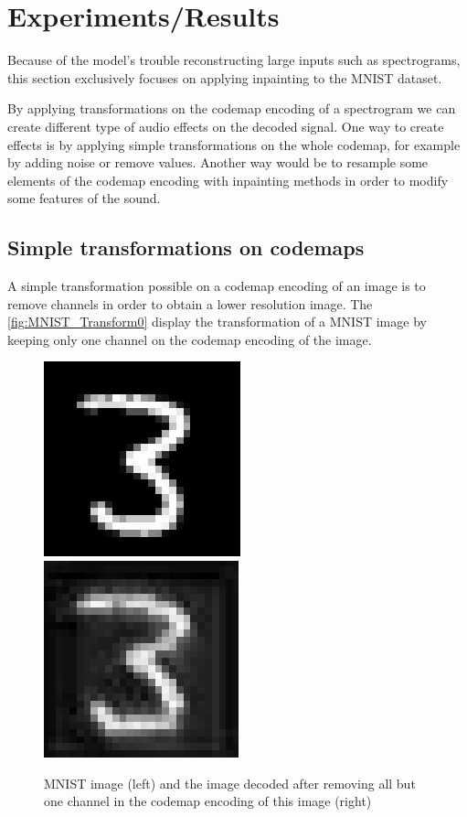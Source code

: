 \documentclass{article}
\begin{document}
\section{Experiments/Results}\label{sec:experiments}

Because of the model's trouble reconstructing large inputs such as spectrograms, this section exclusively focuses on applying inpainting to the MNIST dataset.

By applying transformations on the codemap encoding of a spectrogram we can create different type of audio effects on the decoded signal. One way to create effects is by applying simple transformations on the whole codemap, for example by adding noise or remove values. Another way would be to resample some elements of the codemap encoding with inpainting methods in order to modify some features of the sound.

\subsection{Simple transformations on codemaps}

A simple transformation possible on a codemap encoding of an image is to remove channels in order to obtain a lower resolution image. The \autoref{fig:MNIST_Transform0} display the transformation of a MNIST image by keeping only one channel on the codemap encoding of the image.

\begin{figure}[ht]
    \centering
    \includegraphics[width=0.4\columnwidth]{experiments/MNIST_transformations/0_orig.PNG}
    \includegraphics[width=0.4\columnwidth]{experiments/MNIST_transformations/0_low.PNG}
    \caption{MNIST image (left) and the image decoded after removing all but one channel in the codemap encoding of this image (right)}
    \label{fig:MNIST_Transform0}
\end{figure}
\end{document}
